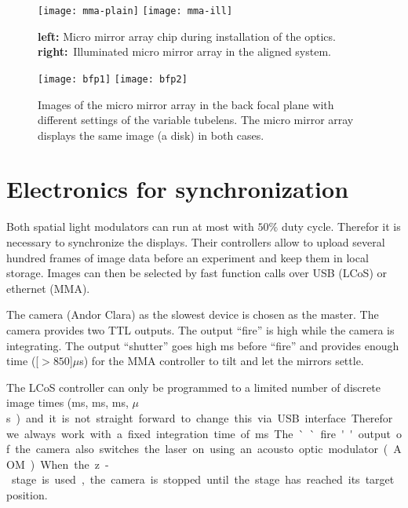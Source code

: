 \begin{figure}[!hbt]
  \centering
  \texttt{[image: mma-plain]}
  \texttt{[image: mma-ill]}
  \caption{{\bf left:} Micro mirror array chip during installation of
    the optics. {\bf right:}~Illuminated micro mirror array in the
    aligned system.}
  \label{fig:mma-closeup}
\end{figure}

\begin{figure}[!hbt]
  \centering
  \texttt{[image: bfp1]}
  \texttt{[image: bfp2]}
  \caption{Images of the micro mirror array in the back focal plane
    with different settings of the variable tubelens. The micro mirror
    array displays the same image (a disk) in both cases.}
  \label{fig:tubelens-bfp}
\end{figure}

\newpage
\section{Electronics for synchronization}
Both spatial light modulators can run at most with $50\%$ duty
cycle. Therefor it is necessary to synchronize the displays. Their
controllers allow to upload several hundred frames of image data
before an experiment and keep them in local storage. Images can then
be selected by fast function calls over USB (LCoS) or ethernet (MMA).

The camera (Andor Clara) as the slowest device is chosen as the
master. The camera provides two TTL outputs. The output ``fire'' is
high while the camera is integrating. The output ``shutter'' goes high
\unit[1]{ms} before ``fire'' and provides enough time
(\unit[$>850$]{$\mu$s}) for the MMA controller to tilt and let the
mirrors settle.

The LCoS controller can only be programmed to a limited number of
discrete image times (\unit[20]{ms}, \unit[10]{ms}, \unit[5]{ms},
\unit[200]{$\mu$s}) and it is not straight forward to change this via
USB interface. Therefor we always work with a fixed integration time
of \unit[20]{ms}. The ``fire'' output of the camera also switches the
laser on using an acousto optic modulator (AOM).

When the z-stage is used, the camera is stopped until the stage has
reached its target position.

